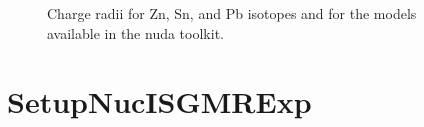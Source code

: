 \documentclass[letterpaper,10pt,english]{sphinxmanual}
\begin{document}
\begin{figure}[htbp]
\centering
\capstart

\noindent{}
\caption{Charge radii for Zn, Sn, and Pb isotopes and for the models available in the nuda toolkit.}\label{\detokenize{source/api/setup_nuc_rch_exp:id1}}\end{figure}

\sphinxstepscope


\section{SetupNucISGMRExp}
\label{\detokenize{source/api/setup_nuc_isgmr_exp:setupnucisgmrexp}}\label{\detokenize{source/api/setup_nuc_isgmr_exp::doc}}\label{\detokenize{source/api/setup_nuc_isgmr_exp:module-nucleardatapy.setup_nuc_isgmr_exp}}
\end{document}
